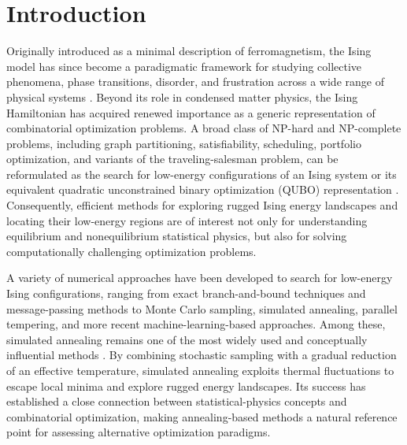 \documentclass[
reprint,
amsmath,amssymb,
aps,
pre,
floatfix,
]{revtex4-2}
\begin{document}
\maketitle




\section{Introduction}
\label{sec:intro}
Originally introduced as a minimal description of ferromagnetism, the Ising
model has since become a paradigmatic framework for studying collective
phenomena, phase transitions, disorder, and frustration across a wide range
of physical systems \cite{SK1,SK2,Nishimori2001,BinderYoung1986}. Beyond its role in condensed matter physics, the Ising Hamiltonian has acquired renewed importance as a generic representation of combinatorial optimization problems. A broad class of NP-hard and NP-complete problems, including graph partitioning, satisfiability, scheduling, portfolio optimization, and variants of the traveling-salesman problem, can be reformulated as the search for low-energy configurations of an Ising system or its equivalent quadratic unconstrained binary optimization (QUBO) representation \cite{Barahona1982,Lucas_2014}. Consequently, efficient methods for exploring rugged Ising energy landscapes and locating their low-energy regions are of interest not only for understanding equilibrium and nonequilibrium statistical physics, but also for solving computationally challenging optimization problems.



A variety of numerical approaches have been developed to search for low-energy Ising configurations, ranging from exact branch-and-bound techniques and message-passing methods to Monte Carlo sampling, simulated annealing, parallel tempering, and more recent machine-learning-based approaches. Among these, simulated annealing remains one of the most widely used and conceptually
influential methods \cite{Simu_Ann}. By combining stochastic sampling with a gradual reduction of an effective temperature, simulated annealing exploits thermal fluctuations to escape local minima and explore rugged energy landscapes. Its success has established a close connection between statistical-physics concepts and combinatorial optimization, making annealing-based methods a natural reference point  for assessing alternative optimization paradigms.
\end{document}
